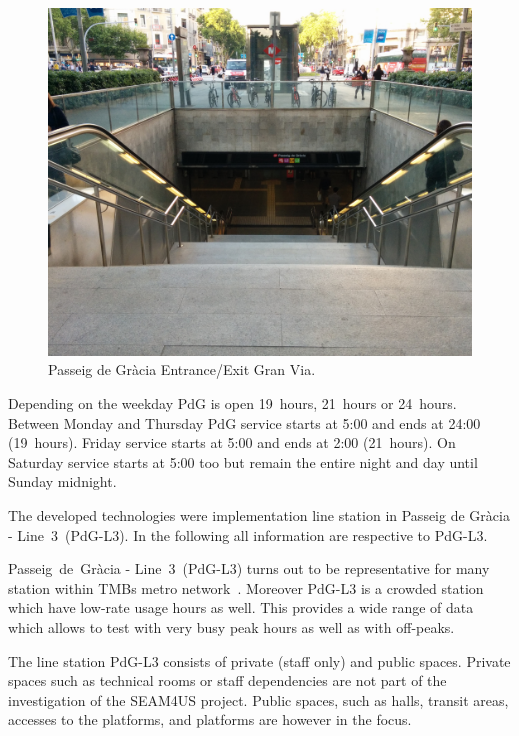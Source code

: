 \begin{figure}[htbp]
  \centering
  \includegraphics[width=\linewidth]{Figures/PdG-L3_entranceExit.jpg} 
  \caption{Passeig de Gr\`{a}cia Entrance/Exit Gran Via. \cite{TMB_2014}}
  \label{fig:PdG_entranceExit}
\end{figure}

Depending on the weekday PdG is open 19~hours, 21~hours or 24~hours. Between Monday and Thursday PdG service starts at 5:00 and ends at 24:00 (19~hours). Friday service starts at 5:00 and ends at 2:00 (21~hours). On Saturday service starts at 5:00 too but remain the entire night and day until Sunday midnight.

The developed technologies were implementation line station in Passeig de Gr\`{a}cia - Line~3~(PdG-L3). In the following all information are respective to PdG-L3.

Passeig~de~Gr\`{a}cia - Line~3~(PdG-L3) turns out to be representative for many station within TMBs metro network~\cite{TMB}. Moreover PdG-L3 is a crowded station which have low-rate usage hours as well. This provides a wide range of data which allows to test with very busy peak hours as well as with off-peaks.

The line station PdG-L3 consists of private (staff only) and public spaces. Private spaces such as technical rooms or staff dependencies are not part of the investigation of the SEAM4US project. Public spaces, such as halls, transit areas, accesses to the platforms, and platforms are however in the focus.

